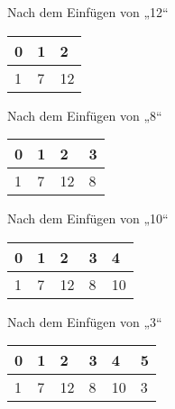 \documentclass{bschlangaul-aufgabe}
\begin{document}
\begin{enumerate}
\begin{enumerate}
\begin{liDiagramm}{Nach dem Einfügen von „12“}
\begin{tabular}{lll}
\bf{0} & \bf{1} & \bf{2} \\
\hline
1      & 7      & 12     \\
\end{tabular}

\end{liDiagramm}

\begin{liDiagramm}{Nach dem Einfügen von „8“}
\begin{tabular}{llll}
\bf{0} & \bf{1} & \bf{2} & \bf{3} \\
\hline
1      & 7      & 12     & 8      \\
\end{tabular}

\end{liDiagramm}

\begin{liDiagramm}{Nach dem Einfügen von „10“}
\begin{tabular}{lllll}
\bf{0} & \bf{1} & \bf{2} & \bf{3} & \bf{4} \\
\hline
1      & 7      & 12     & 8      & 10     \\
\end{tabular}

\end{liDiagramm}

\begin{liDiagramm}{Nach dem Einfügen von „3“}
\begin{tabular}{llllll}
\bf{0} & \bf{1} & \bf{2} & \bf{3} & \bf{4} & \bf{5} \\
\hline
1      & 7      & 12     & 8      & 10     & 3      \\
\end{tabular}

\end{liDiagramm}


\end{enumerate}
\end{enumerate}
\end{document}
